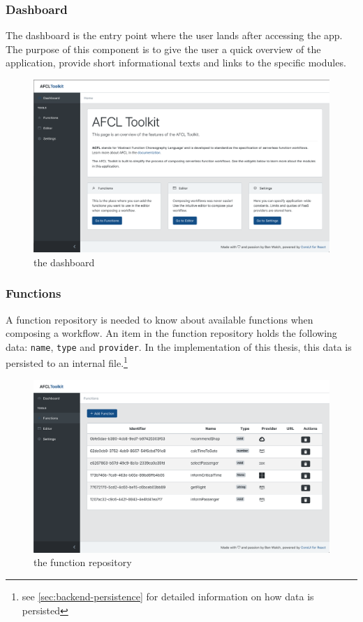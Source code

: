 \documentclass[a4paper,12pt,pdftex,halfparskip,cleardoubleempty,bibtotoc,liststotoc]{scrbook}
\begin{document}
\subsubsection{Dashboard}

The dashboard is the entry point where the user lands after accessing the app. The purpose of this component is to give the user a quick overview of the application, provide short informational texts and links to the specific modules. 

\begin{figure}[H]
  \centering
  \includegraphics[width=\textwidth]{dashboard}
  \caption{the dashboard}
\end{figure}

\subsubsection{Functions}

A function repository is needed to know about available functions when composing a workflow. An item in the function repository holds the following data: \texttt{name}, \texttt{type} and \texttt{provider}. In the implementation of this thesis, this data is persisted to an internal file.\footnote{see \ref{sec:backend-persistence} for detailed information on how data is persisted}

\begin{figure}[H]
  \centering
  \includegraphics[width=\textwidth]{functions}
  \caption{the function repository}
\end{figure}
\end{document}
